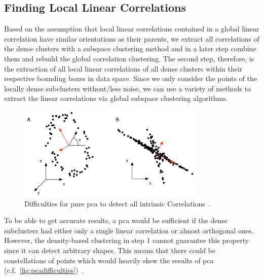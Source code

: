 \subsection{Finding Local Linear Correlations}\label{ssec:findinglocals}
Based on the assumption that local linear correlations contained in a global linear correlation have similar orientations as their parents, we extract all correlations of the dense clusters with a subspace clustering method and in a later step combine them and rebuild the global correlation clustering. 
The second step, therefore, is the extraction of all local linear correlations of all dense clusters within their respective bounding boxes in data space. Since we only consider the points of the locally dense subclusters without/less noise, we can use a variety of methods to extract the linear correlations via global subspace clustering algorithms. 

\begin{figure}[h]
    \centering
    \includegraphics[width=0.8\textwidth]{figures/PCAdifficulties.png}
    \caption{Difficulties for pure \acrshort{pca} to detect all intrinsic Correlations~\cite{PCAshlens2014tutorial}.}
    \label{fig:pcadifficulties}
\end{figure}

To be able to get accurate results, a \gls{pca} would be sufficient if the dense subclusters had either only a single linear correlation or almost orthogonal ones. However, the density-based clustering in step 1 cannot guarantee this property since it can detect arbitrary shapes. This means that there could be constellations of points which would heavily skew the results of \gls{pca} (c.f.~\autoref{fig:pcadifficulties})~\cite{PCAshlens2014tutorial}. 

